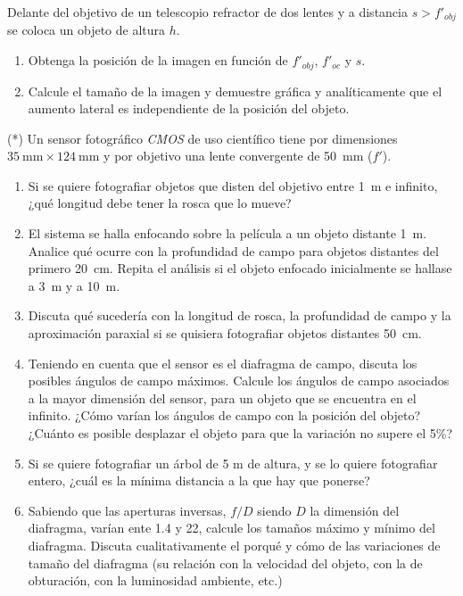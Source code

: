 \item Delante del objetivo de un telescopio refractor de dos lentes y a distancia $s > f'_{obj}$ se coloca un objeto de altura $h$.
\begin{enumerate}
	\item Obtenga la posición de la imagen en función de $f'_{obj}$, $f'_{oc}$ y $s$. 
	\item Calcule el tamaño de la imagen y demuestre gráfica y analíticamente que el aumento lateral es independiente de la posición del objeto.
\end{enumerate}


\item (*) Un sensor fotográfico \emph{CMOS} de uso científico tiene por dimensiones \(\SI{35}{\milli\metre} \times \SI{124}{\milli\metre}\) y por objetivo una lente convergente de \SI{50}{\milli\metre} ($f'$).
\begin{enumerate}
	\item Si se quiere fotografiar objetos que disten del objetivo entre \SI{1}{\metre} e infinito, ¿qué longitud debe tener la rosca que lo mueve?
	\item El sistema se halla enfocando sobre la película a un objeto distante \SI{1}{\metre}.
	Analice qué ocurre con la profundidad de campo para objetos distantes del primero \SI{20}{\centi\metre}.
	Repita el análisis si el objeto enfocado inicialmente se hallase a \SI{3}{\metre} y a \SI{10}{\metre}.
	\item Discuta qué sucedería con la longitud de rosca, la profundidad de campo y la aproximación paraxial si se quisiera fotografiar objetos distantes \SI{50}{\centi\metre}.
	\item Teniendo en cuenta que el sensor es el diafragma de campo, discuta los posibles ángulos de campo máximos.
	Calcule los ángulos de campo asociados a la mayor dimensión del sensor, para un objeto que se encuentra en el infinito.
	¿Cómo varían los ángulos de campo con la posición del objeto?
	¿Cuánto es posible desplazar el objeto para que la variación no supere el 5\%?
	\item Si se quiere fotografiar un árbol de 5 m de altura, y se lo quiere fotografiar entero, ¿cuál es la mínima distancia a la que hay que ponerse?
	\item Sabiendo que las aperturas inversas, $f/D$ siendo \(D\) la dimensión del diafragma, varían ente \num{1.4} y \num{22}, calcule los tamaños máximo y mínimo del diafragma.
	Discuta cualitativamente el porqué y cómo de las variaciones de tamaño del diafragma (su relación con la velocidad del objeto, con la de obturación, con la luminosidad ambiente, etc.)
\end{enumerate}
